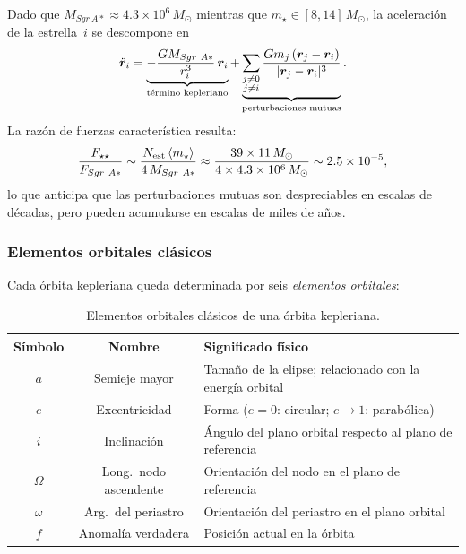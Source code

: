\documentclass[12pt,a4paper]{article}
\newcommand{\SgrA}{Sgr~A*}
\newcommand{\Msol}{M_{\odot}}
\begin{document}
Dado que $M_{\SgrA} \approx 4.3 \times 10^{6}\,\Msol$ mientras que
$m_\star \in [8, 14]\,\Msol$, la aceleración de la estrella~$i$ se descompone en
\begin{equation}
  \ddot{\bm{r}}_i =
    \underbrace{-\frac{G M_{\SgrA}}{r_i^3}\,\bm{r}_i}_{\text{término kepleriano}}
    +
    \underbrace{\sum_{\substack{j \neq 0 \\ j \neq i}}
      \frac{G m_j\,(\bm{r}_j - \bm{r}_i)}{|\bm{r}_j - \bm{r}_i|^3}}_{%
      \text{perturbaciones mutuas}}.
  \label{eq:kep_pert}
\end{equation}
La razón de fuerzas característica resulta:
\begin{equation}
  \frac{F_{\star\star}}{F_{\SgrA}}
    \sim \frac{N_{\rm est}\,\langle m_\star \rangle}{4\,M_{\SgrA}}
    \approx \frac{39 \times 11\,\Msol}{4 \times 4.3 \times 10^{6}\,\Msol}
    \sim 2.5 \times 10^{-5},
  \label{eq:ratio_fuerzas}
\end{equation}
lo que anticipa que las perturbaciones mutuas son despreciables en escalas de décadas,
pero pueden acumularse en escalas de miles de años.

\subsubsection{Elementos orbitales clásicos}
\label{subsubsec:elementos}

Cada órbita kepleriana queda determinada por seis \emph{elementos orbitales}:

\begin{table}[H]
  \centering
  \caption{Elementos orbitales clásicos de una órbita kepleriana.}
  \label{tab:elementos}
  \begin{tabular}{ccp{7.5cm}}
    \toprule
    Símbolo & Nombre & Significado físico \\
    \midrule
    $a$ & Semieje mayor & Tamaño de la elipse; relacionado con la energía orbital \\
    $e$ & Excentricidad & Forma ($e=0$: circular; $e\to1$: parabólica) \\
    $i$ & Inclinación    & Ángulo del plano orbital respecto al plano de referencia \\
    $\Omega$ & Long.\ nodo ascendente & Orientación del nodo en el plano de referencia \\
    $\omega$ & Arg.\ del periastro & Orientación del periastro en el plano orbital \\
    $f$ & Anomalía verdadera & Posición actual en la órbita \\
    \bottomrule
  \end{tabular}
\end{table}
\end{document}
